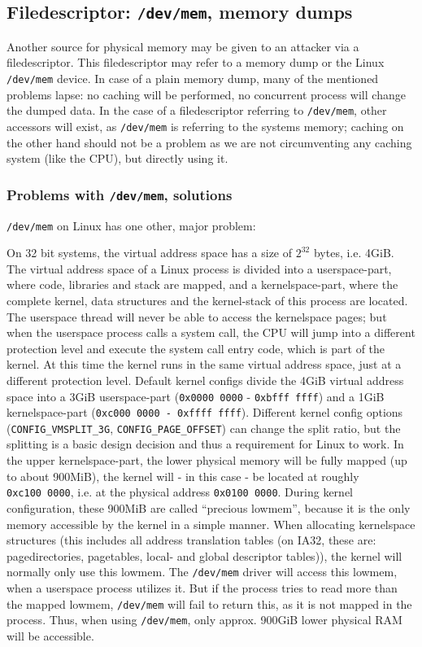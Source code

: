 \subsection{Filedescriptor: \texttt{/dev/mem}, memory dumps}

Another source for physical memory may be given to an attacker via a
filedescriptor. This filedescriptor may refer to a memory dump or the Linux
\texttt{/dev/mem} device. In case of a plain memory dump, many of the mentioned
problems lapse: no caching will be performed, no concurrent process will change
the dumped data. In the case of a filedescriptor referring to \texttt{/dev/mem},
other accessors will exist, as \texttt{/dev/mem} is referring to the systems
memory; caching on the other hand should not be a problem as we are not
circumventing any caching system (like the CPU), but directly using it.

\subsubsection{Problems with \texttt{/dev/mem}, solutions}

\texttt{/dev/mem} on Linux has one other, major problem:

\label{kerneluserdivision} On 32 bit systems, the virtual address space has a
size of $2^{32}$ bytes, i.e.  4GiB.  The virtual address space of a Linux
process is divided into a userspace-part, where code, libraries and stack are
mapped, and a kernelspace-part, where the complete kernel, data structures and
the kernel-stack of this process are located. The userspace thread will never be
able to access the kernelspace pages; but when the userspace process calls a
system call, the CPU will jump into a different protection level and execute the
system call entry code, which is part of the kernel. At this time the kernel
runs in the same virtual address space, just at a different protection level.
Default kernel configs divide the 4GiB virtual address space into a 3GiB
userspace-part (\texttt{0x0000~0000} - \texttt{0xbfff~ffff}) and a 1GiB
kernelspace-part (\texttt{0xc000~0000 - 0xffff~ffff}).  Different kernel config
options (\texttt{CONFIG\_VMSPLIT\_3G}, \texttt{CONFIG\_PAGE\_OFFSET}) can change
the split ratio, but the splitting is a basic design decision and thus a
requirement for Linux to work. In the upper kernelspace-part, the lower physical
memory will be fully mapped (up to about 900MiB), the kernel will - in this case
- be located at roughly \texttt{0xc100~0000}, i.e. at the physical address
\texttt{0x0100~0000}. During kernel configuration, these 900MiB are called
``precious lowmem'', because it is the only memory accessible by the kernel in a
simple manner. When allocating kernelspace structures (this includes all address
translation tables (on IA32, these are: pagedirectories, pagetables, local- and
global descriptor tables)\label{linuxATTinlowmem}), the kernel will normally
only use this lowmem.  The \texttt{/dev/mem} driver will access this lowmem,
when a userspace process utilizes it. But if the process tries to read more than
the mapped lowmem, \texttt{/dev/mem} will fail to return this, as it is not
mapped in the process.  Thus, when using \texttt{/dev/mem}, only approx. 900GiB
lower physical RAM will be accessible.

